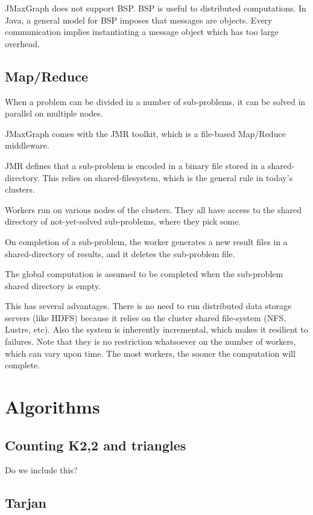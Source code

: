 \documentclass[11pt,a4paper]{article}
\begin{document}
JMaxGraph does not support BSP. BSP is useful to distributed computations. In Java, a general model for BSP imposes that messages are objects. Every communication implies instantiating a message object which has too large overhead.

\subsection{Map/Reduce}

When a problem can be divided in a number of sub-problems, it can be solved in parallel on multiple nodes.

JMaxGraph comes with the JMR toolkit, which is a file-based Map/Reduce middleware.

JMR defines that a sub-problem is encoded in a binary file stored in a shared-directory. This relies on shared-filesystem, which is the general rule in today's clusters.

Workers run on various nodes of the clusters. They all have access to the shared directory of not-yet-solved sub-problems, where they pick some.

On completion of a sub-problem, the worker generates a new result files in a shared-directory of results, and it deletes the sub-problem file.

The global computation is assumed to be completed when the sub-problem shared directory is empty.

This has several advantages. There is no need to run distributed data storage servers (like HDFS) because it relies on the cluster shared file-system (NFS, Lustre, etc). Also the system is inherently incremental, which makes it resilient to failures.
Note that they is no restriction whatsoever on the number of workers, which can vary upon time. The most workers, the sooner the computation  will complete.

\section{Algorithms}

\subsection{Counting K2,2 and triangles}

Do we include this?

\subsection{Tarjan}
\end{document}
